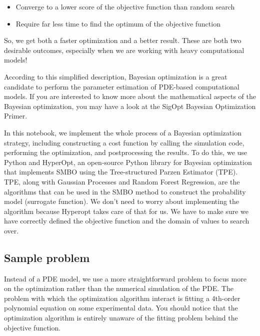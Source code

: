 \begin{subappendices}
\begin{itshape}
\begin{itemize}
\item
Converge to a lower score of the objective function than random search
\item
Require far less time to find the optimum of the objective function
\end{itemize}

So, we get both a faster optimization and a better result. These are both two desirable outcomes, especially when we are working with heavy computational models!
\end{itshape}

According to this simplified description, Bayesian optimization is a great candidate to perform the parameter estimation of \gls{PDE}-based computational models. If you are interested to know more about the mathematical aspects of the Bayesian optimization, you may have a look at the SigOpt Bayesian Optimization Primer.


In this notebook, we implement the whole process of a Bayesian optimization strategy, including constructing a cost function by calling the simulation code, performing the optimization, and postprocessing the results. To do this, we use Python and HyperOpt, an open-source Python library for Bayesian optimization that implements \gls{SMBO} using the Tree-structured Parzen Estimator (\gls{TPE}). \gls{TPE}, along with Gaussian Processes and Random Forest Regression, are the algorithms that can be used in the \gls{SMBO} method to construct the probability model (surrogate function). We don't need to worry about implementing the algorithm because Hyperopt takes care of that for us. We have to make sure we have correctly defined the objective function and the domain of values to search over.

\subsection{Sample problem}

Instead of a \gls{PDE} model, we use a more straightforward problem to focus more on the optimization rather than the numerical simulation of the \gls{PDE}. The problem with which the optimization algorithm interact is fitting a 4th-order polynomial equation on some experimental data. You should notice that the optimization algorithm is entirely unaware of the fitting problem behind the objective function.


\end{subappendices}
